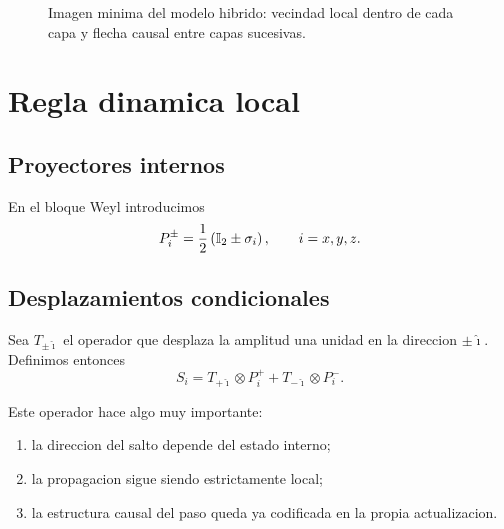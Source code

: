 \begin{figure}[h!]
\centering
{}
\caption{Imagen minima del modelo hibrido: vecindad local dentro de cada capa y flecha causal entre capas sucesivas.}
\end{figure}

\section{Regla dinamica local}
\subsection{Proyectores internos}
En el bloque Weyl introducimos
\begin{equation}
P_i^\pm=\frac{1}{2}\left(\mathbb{I}_2\pm \sigma_i\right),
\qquad i=x,y,z.
\end{equation}

\subsection{Desplazamientos condicionales}
Sea \(T_{\pm \hat{\imath}}\) el operador que desplaza la amplitud una unidad en la direccion \(\pm \hat{\imath}\). Definimos entonces
\begin{equation}
S_i=
T_{+\hat{\imath}}\otimes P_i^+
+
T_{-\hat{\imath}}\otimes P_i^-.
\label{c28:eq:Si}
\end{equation}

Este operador hace algo muy importante:
\begin{enumerate}[label=\arabic*.]
    \item la direccion del salto depende del estado interno;
    \item la propagacion sigue siendo estrictamente local;
    \item la estructura causal del paso queda ya codificada en la propia actualizacion.
\end{enumerate}

